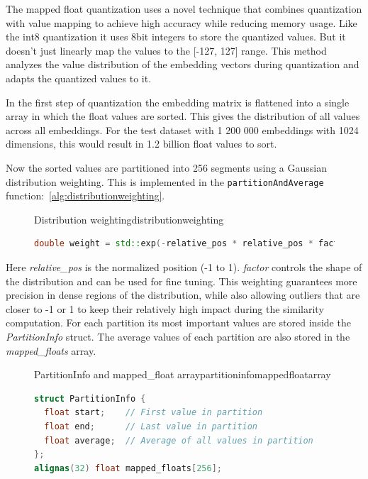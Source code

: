 The mapped float quantization uses a novel technique that combines quantization with value mapping to achieve high accuracy while reducing memory usage. Like the int8 quantization it uses 8bit integers to store the quantized values. But it doesn't just linearly map the values to the [-127, 127] range. This method analyzes the value distribution of the embedding vectors during quantization and adapts the quantized values to it.

In the first step of quantization the embedding matrix is flattened into a single array in which the float values are sorted. This gives the distribution of all values across all embeddings. For the test dataset with 1 200 000 embeddings with 1024 dimensions, this would result in 1.2 billion float values to sort.

Now the sorted values are partitioned into 256 segments using a Gaussian distribution weighting. This is implemented in the \texttt{partitionAndAverage} function:~\autoref{alg:distributionweighting}.
\begin{figure}[h]
    \begin{algorithm}{Distribution weighting}{distributionweighting}
        \begin{lstlisting}[language=C++]
double weight = std::exp(-relative_pos * relative_pos * factor);
    \end{lstlisting}
    \end{algorithm}
\end{figure}
Here \textit{relative\_pos} is the normalized position (-1 to 1). \textit{factor} controls the shape of the distribution and can be used for fine tuning. This weighting guarantees more precision in dense regions of the distribution, while also allowing outliers that are closer to -1 or 1 to keep their relatively high impact during the similarity computation.
For each partition its most important values are stored inside the \textit{PartitionInfo} struct. The average values of each partition are also stored in the \textit{mapped\_floats} array.
\begin{figure}[h]
    \begin{algorithm}{PartitionInfo and mapped\_float array}{partitioninfomappedfloatarray}
        \begin{lstlisting}[language=C++]
struct PartitionInfo {
  float start;    // First value in partition
  float end;      // Last value in partition
  float average;  // Average of all values in partition
};
alignas(32) float mapped_floats[256];
    \end{lstlisting}
    \end{algorithm}
\end{figure}
